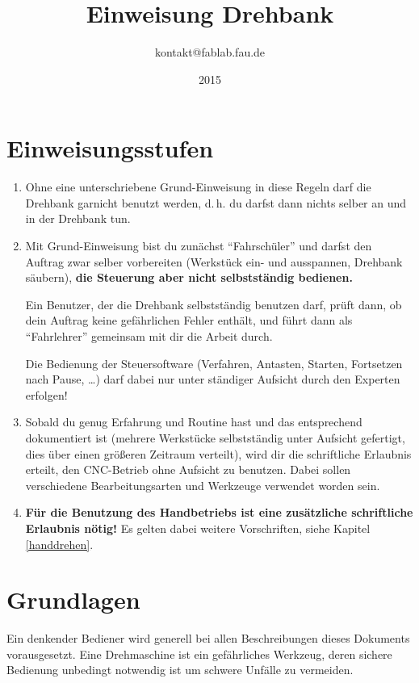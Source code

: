 \documentclass{\basedir/fablab-document}
\date{2015}
\author{kontakt@fablab.fau.de}
\title{Einweisung Drehbank}
\begin{document}
\listoftodos

\tableofcontents

\newpage



\section{Einweisungsstufen}


\begin{enumerate}
 \item Ohne eine unterschriebene Grund-Einweisung in diese Regeln darf die Drehbank garnicht benutzt werden, d.\,h. du darfst dann nichts selber an und in der Drehbank tun.
 \item Mit Grund-Einweisung bist du zunächst \enquote{Fahrschüler} und darfst den Auftrag zwar selber vorbereiten (Werkstück ein- und ausspannen, Drehbank säubern), \textbf{die Steuerung aber nicht selbstständig bedienen.} 

       Ein Benutzer, der die Drehbank selbstständig benutzen darf, prüft dann, ob dein Auftrag keine gefährlichen Fehler enthält, und führt dann als \enquote{Fahrlehrer} gemeinsam mit dir die Arbeit durch.

 Die Bedienung der Steuersoftware (Verfahren, Antasten, Starten, Fortsetzen nach Pause, \dots) darf dabei nur unter ständiger Aufsicht durch den Experten erfolgen!
 \item Sobald du genug Erfahrung und Routine hast und das entsprechend dokumentiert ist (mehrere Werkstücke selbstständig unter Aufsicht gefertigt, dies über einen größeren Zeitraum verteilt), wird dir die schriftliche Erlaubnis erteilt, den CNC-Betrieb ohne Aufsicht zu benutzen. Dabei sollen verschiedene Bearbeitungsarten und Werkzeuge verwendet worden sein.
 \item  \textbf{Für die Benutzung des Handbetriebs ist eine zusätzliche schriftliche Erlaubnis nötig!} Es gelten dabei weitere Vorschriften, siehe Kapitel \ref{handdrehen}.
\end{enumerate}


\newpage
\section{Grundlagen}

Ein denkender Bediener wird generell bei allen Beschreibungen dieses Dokuments vorausgesetzt. Eine Drehmaschine ist ein gefährliches Werkzeug, deren sichere Bedienung unbedingt notwendig ist um schwere Unfälle zu vermeiden.
\end{document}
